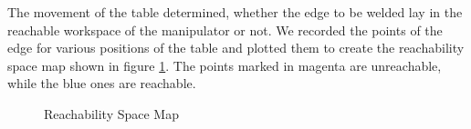 The movement of the table determined, whether the edge to be welded lay in the reachable workspace of the manipulator or not. We recorded the points of the edge for various positions of the table and plotted them to create the reachability space map shown in figure \ref{fig:rc3}. The points marked in magenta are unreachable, while the blue ones are reachable. 
\begin{figure}[!ht] %
	\centering
	\caption{Reachability Space Map}
	\label{fig:rc3}
\end{figure}

